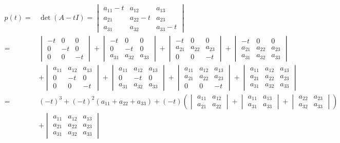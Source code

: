 \documentclass[UTF8,nofonts]{ctexart}
\begin{document}
\begin{align*}
p(t)=&\det(A-tI)=
\begin{vmatrix}
a_{11}-t & a_{12} & a_{13} \\
a_{21} & a_{22}-t & a_{23} \\
a_{31} & a_{32} & a_{33}-t
\end{vmatrix} \\
=&
\begin{vmatrix}-t&0&0\\0&-t&0\\0&0&-t\end{vmatrix}+
\begin{vmatrix}-t&0&0\\0&-t&0\\a_{31}&a_{32}&a_{33}\end{vmatrix}+
\begin{vmatrix}-t&0&0\\a_{21}&a_{22}&a_{23}\\0&0&-t\end{vmatrix}+
\begin{vmatrix}-t&0&0\\a_{21}&a_{22}&a_{23}\\a_{31}&a_{32}&a_{33}\end{vmatrix} \\
&+
\begin{vmatrix}a_{11}&a_{12}&a_{13}\\0&-t&0\\0&0&-t\end{vmatrix}+
\begin{vmatrix}a_{11}&a_{12}&a_{13}\\0&-t&0\\a_{31}&a_{32}&a_{33}\end{vmatrix}+
\begin{vmatrix}a_{11}&a_{12}&a_{13}\\a_{21}&a_{22}&a_{23}\\0&0&-t\end{vmatrix}+
\begin{vmatrix}a_{11}&a_{12}&a_{13}\\a_{21}&a_{22}&a_{23}\\a_{31}&a_{32}&a_{33}\end{vmatrix} \\
=&
(-t)^3+(-t)^2(a_{11}+a_{22}+a_{33})+
(-t)\left(\begin{vmatrix}a_{11}&a_{12}\\a_{21}&a_{22}\end{vmatrix}+\begin{vmatrix}a_{11}&a_{13}\\a_{31}&a_{33}\end{vmatrix}+\begin{vmatrix}a_{22}&a_{23}\\a_{32}&a_{33}\end{vmatrix}\right) \\
&+
\begin{vmatrix}a_{11}&a_{12}&a_{13}\\a_{21}&a_{22}&a_{23}\\a_{31}&a_{32}&a_{33}\end{vmatrix}
\end{align*}
\end{document}
